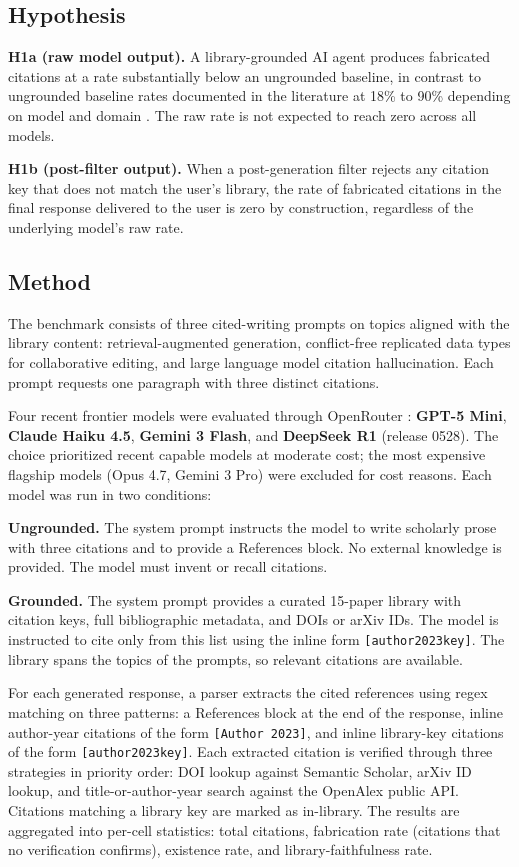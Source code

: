 \subsection{Hypothesis}

\textbf{H1a (raw model output).} A library-grounded AI agent produces fabricated citations at a rate substantially below an ungrounded baseline, in contrast to ungrounded baseline rates documented in the literature at 18\% to 90\% depending on model and domain \cite{walters2023fabrication, asai2025openscholar}. The raw rate is not expected to reach zero across all models.

\textbf{H1b (post-filter output).} When a post-generation filter rejects any citation key that does not match the user's library, the rate of fabricated citations in the final response delivered to the user is zero by construction, regardless of the underlying model's raw rate.

\subsection{Method}

The benchmark consists of three cited-writing prompts on topics aligned with the library content: retrieval-augmented generation, conflict-free replicated data types for collaborative editing, and large language model citation hallucination. Each prompt requests one paragraph with three distinct citations.

Four recent frontier models were evaluated through OpenRouter \cite{openrouter2024}: \textbf{GPT-5 Mini}, \textbf{Claude Haiku 4.5}, \textbf{Gemini 3 Flash}, and \textbf{DeepSeek R1} (release 0528). The choice prioritized recent capable models at moderate cost; the most expensive flagship models (Opus 4.7, Gemini 3 Pro) were excluded for cost reasons. Each model was run in two conditions:

\textbf{Ungrounded.} The system prompt instructs the model to write scholarly prose with three citations and to provide a References block. No external knowledge is provided. The model must invent or recall citations.

\textbf{Grounded.} The system prompt provides a curated 15-paper library with citation keys, full bibliographic metadata, and DOIs or arXiv IDs. The model is instructed to cite only from this list using the inline form \texttt{[author2023key]}. The library spans the topics of the prompts, so relevant citations are available.

For each generated response, a parser extracts the cited references using regex matching on three patterns: a References block at the end of the response, inline author-year citations of the form \texttt{[Author 2023]}, and inline library-key citations of the form \texttt{[author2023key]}. Each extracted citation is verified through three strategies in priority order: DOI lookup against Semantic Scholar, arXiv ID lookup, and title-or-author-year search against the OpenAlex public API. Citations matching a library key are marked as in-library. The results are aggregated into per-cell statistics: total citations, fabrication rate (citations that no verification confirms), existence rate, and library-faithfulness rate.

